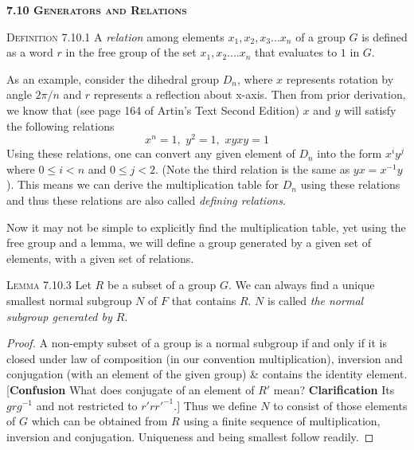 \documentclass[12pt]{article}
\begin{document}
\textbf {\textsc {7.10 Generators and Relations}}
\par
\textsc {Definition 7.10.1} A \emph {relation} among elements $x_{1},x_{2},x_{3}...x_{n}$ of a group $G$ is defined as a word $r$ in the free group of the set $x_{1},x_{2}....x_{n}$ that evaluates to $1$ in $G$.
\par
As an example, consider the dihedral group $D_{n}$, where $x$ represents rotation by angle $2\pi / n$ and $r$ represents a reflection about x-axis. Then from prior derivation, we know that (see page 164 of Artin's Text Second Edition) $x$ and $y$ will satisfy the following relations\\
\begin{equation*}
x^{n}=1,\,\,y^{2}=1,\,\,xyxy=1
\end{equation*}
Using these relations, one can convert any given element of $D_{n}$ into the form $x^{i}y^{j}$ where $0\leq i < n$ and $0\leq j<2$. (Note the third relation is the same as $yx=x^{-1}y$). This means we can derive the multiplication table for $D_{n}$ using these relations and thus these relations are also called \emph{defining relations}.
\par
Now it may not be simple to explicitly find the multiplication table, yet using the free group and a lemma, we will define a group generated by a given set of elements, with a given set of relations.
\par
\textsc {Lemma 7.10.3} Let $R$ be a subset of a group $G$. We can always find a unique smallest normal subgroup $N$ of $F$ that contains $R$. $N$ is called \emph {the normal subgroup generated by $R$}.
\begin{proof}
A non-empty subset of a group is a normal subgroup if and only if it is closed under law of composition (in our convention multiplication), inversion and conjugation (with an element of the given group) \& contains the identity element. [{\bf Confusion } What does conjugate of an element of $R'$ mean? {\bf Clarification} Its $grg^{-1}$ and not restricted to $r' r r'^{-1}$.] Thus we define $N$ to consist of those elements of $G$ which can be obtained from $R$ using a finite sequence of multiplication, inversion and conjugation. Uniqueness and being smallest follow readily.
\end{proof}
\end{document}
